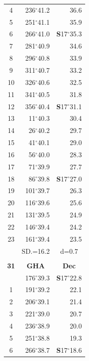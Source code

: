 \documentclass[10pt, a4paper]{report}
\begin{document}
\begin{scriptsize}
\begin{tabular*}{0.2\textwidth}[t]{@{\extracolsep{\fill}}|c|rr|}
4 & 236$^\circ$41.2 & 36.6\\
5 & 251$^\circ$41.1 & 35.9\\[2Pt]
6 & 266$^\circ$41.0 & \textbf{S}17$^\circ$35.3\\
7 & 281$^\circ$40.9 & 34.6\\
8 & 296$^\circ$40.8 & 33.9\\
9 & 311$^\circ$40.7 & \raisebox{0.24ex}{\boldmath$\cdot$~\boldmath$\cdot$~~}33.2\\
10 & 326$^\circ$40.6 & 32.5\\
11 & 341$^\circ$40.5 & 31.8\\[2Pt]
12 & 356$^\circ$40.4 & \textbf{S}17$^\circ$31.1\\
13 & 11$^\circ$40.3 & 30.4\\
14 & 26$^\circ$40.2 & 29.7\\
15 & 41$^\circ$40.1 & \raisebox{0.24ex}{\boldmath$\cdot$~\boldmath$\cdot$~~}29.0\\
16 & 56$^\circ$40.0 & 28.3\\
17 & 71$^\circ$39.9 & 27.7\\[2Pt]
18 & 86$^\circ$39.8 & \textbf{S}17$^\circ$27.0\\
19 & 101$^\circ$39.7 & 26.3\\
20 & 116$^\circ$39.6 & 25.6\\
21 & 131$^\circ$39.5 & \raisebox{0.24ex}{\boldmath$\cdot$~\boldmath$\cdot$~~}24.9\\
22 & 146$^\circ$39.4 & 24.2\\
23 & 161$^\circ$39.4 & 23.5\\
\hline
\rule{0pt}{2.4ex} & \multicolumn{1}{c}{SD.=16.2} & \multicolumn{1}{c|}{d=0.7}\\
\hline
\multicolumn{1}{c}{}\\[-0.5ex]\hline
\multicolumn{1}{|c|}{\rule{0pt}{2.6ex}\textbf{31}} & \multicolumn{1}{c}{\textbf{GHA}} & \multicolumn{1}{c|}{\textbf{Dec}}\\
\hline\rule{0pt}{2.6ex}\noindent
0 & 176$^\circ$39.3 & \textbf{S}17$^\circ$22.8\\
1 & 191$^\circ$39.2 & 22.1\\
2 & 206$^\circ$39.1 & 21.4\\
3 & 221$^\circ$39.0 & \raisebox{0.24ex}{\boldmath$\cdot$~\boldmath$\cdot$~~}20.7\\
4 & 236$^\circ$38.9 & 20.0\\
5 & 251$^\circ$38.8 & 19.3\\[2Pt]
6 & 266$^\circ$38.7 & \textbf{S}17$^\circ$18.6\\

\end{tabular*}
\end{scriptsize}
\end{document}
